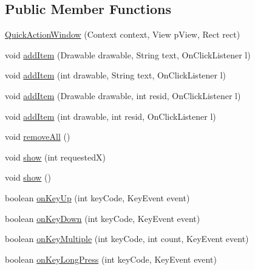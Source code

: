 \subsection*{Public Member Functions}
\begin{DoxyCompactItemize}
\item 
\hyperlink{classcom_1_1zia_1_1freshdocs_1_1widget_1_1quickaction_1_1_quick_action_window_ad399c4c396d18d3e3086ef0bd0007246}{Quick\-Action\-Window} (Context context, View p\-View, Rect rect)
\item 
void \hyperlink{classcom_1_1zia_1_1freshdocs_1_1widget_1_1quickaction_1_1_quick_action_window_a2b36182d76c2793e681d9cb3aafe63fa}{add\-Item} (Drawable drawable, String text, On\-Click\-Listener l)
\item 
void \hyperlink{classcom_1_1zia_1_1freshdocs_1_1widget_1_1quickaction_1_1_quick_action_window_a8c7282672501c80e5c6c8e2911c939e3}{add\-Item} (int drawable, String text, On\-Click\-Listener l)
\item 
void \hyperlink{classcom_1_1zia_1_1freshdocs_1_1widget_1_1quickaction_1_1_quick_action_window_ae587ec6a27f1124dcb47c766685a711d}{add\-Item} (Drawable drawable, int resid, On\-Click\-Listener l)
\item 
void \hyperlink{classcom_1_1zia_1_1freshdocs_1_1widget_1_1quickaction_1_1_quick_action_window_a8e24884c962d4d3a9349194a55925170}{add\-Item} (int drawable, int resid, On\-Click\-Listener l)
\item 
void \hyperlink{classcom_1_1zia_1_1freshdocs_1_1widget_1_1quickaction_1_1_quick_action_window_a8ce0169aa811e283d3268b64d773e570}{remove\-All} ()
\item 
void \hyperlink{classcom_1_1zia_1_1freshdocs_1_1widget_1_1quickaction_1_1_quick_action_window_aa2cdbe40cec7f17b2f1f37b408479cc4}{show} (int requested\-X)
\item 
void \hyperlink{classcom_1_1zia_1_1freshdocs_1_1widget_1_1quickaction_1_1_quick_action_window_a56cb45d925aec492c6045037c16c2a90}{show} ()
\item 
boolean \hyperlink{classcom_1_1zia_1_1freshdocs_1_1widget_1_1quickaction_1_1_quick_action_window_aeb869681edb1747d7030f5a7f824cf01}{on\-Key\-Up} (int key\-Code, Key\-Event event)
\item 
boolean \hyperlink{classcom_1_1zia_1_1freshdocs_1_1widget_1_1quickaction_1_1_quick_action_window_a3ce3389f3e38d4354ac0f5a11bd81290}{on\-Key\-Down} (int key\-Code, Key\-Event event)
\item 
boolean \hyperlink{classcom_1_1zia_1_1freshdocs_1_1widget_1_1quickaction_1_1_quick_action_window_a96d580b9101ebde3ff4d03b99a4f4e67}{on\-Key\-Multiple} (int key\-Code, int count, Key\-Event event)
\item 
boolean \hyperlink{classcom_1_1zia_1_1freshdocs_1_1widget_1_1quickaction_1_1_quick_action_window_a1dda8e102a7e7d9181e9f9fdfae9f8fc}{on\-Key\-Long\-Press} (int key\-Code, Key\-Event event)
\end{DoxyCompactItemize}


